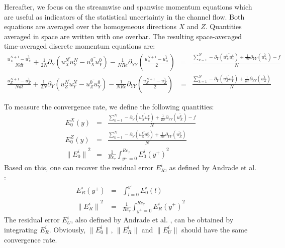 \documentclass[aip,pof,reprint]{revtex4-1}
\begin{document}
\begin{widetext}
Hereafter, we focus on the streamwise and spanwise momentum equations which are useful as indicators of the statistical uncertainty in the channel flow.
Both equations are averaged over the homogeneous directions $X$ and $Z$.
Quantities averaged in space are written with one overbar.
The resulting space-averaged time-averaged discrete momentum equations are:
\begin{eqnarray}
\label{qdm_sum_x}
\frac{\overline{u_X^{N+1}}-\overline{u_X^1}}{Ndt}
+ \frac{1}{2N} \partial_Y \left( \overline{u_X^{N} u_Y^{N}} - \overline{u_X^0 u_Y^0} \right)
- \frac{1}{NRe} \partial_{YY} \left( \frac{\overline{u_X^{N+1}} - \overline{u_X^1}}{2}\right)
& = & \frac{ \sum_{k=1}^N
- \partial_Y \left( \overline{u_X^k u_Y^k} \right)
+ \frac{1}{Re} \partial_{YY} \left( \overline{u_X^k} \right)
- f}{N} \\
\label{qdm_sum_z}
\frac{\overline{u_Z^{N+1}}-\overline{u_Z^1}}{Ndt}
+ \frac{1}{2N} \partial_Y \left( \overline{u_Z^{N} u_Y^{N}} - \overline{u_Z^0 u_Y^0} \right)
- \frac{1}{NRe} \partial_{YY} \left( \frac{\overline{u_Z^{N+1}} - \overline{u_Z^1}}{2}\right)
& = & \frac{\sum_{k=1}^N
- \partial_Y \left( \overline{u_Z^k u_Y^k} \right)
+ \frac{1}{Re} \partial_{YY} \left( \overline{u_Z^k}\right)}{N}
\end{eqnarray}
\end{widetext}

To measure the convergence rate, we define the following quantities:
\begin{eqnarray}
E_0^X\left(y\right) & = & \frac{\sum_{k=1}^N -\partial_Y \left( \overline{u_X^k u_Y^k} \right)+\frac{1}{Re}\partial_{YY}\left( \overline{u_X^k} \right)-f}{N} \nonumber \\
E_0^Z\left(y\right) & = & \frac{\sum_{k=1}^N -\partial_Y \left( \overline{u_Z^k u_Y^k} \right)+\frac{1}{Re}\partial_{YY}\left( \overline{u_Z^k} \right)}{N} \nonumber \\
{\parallel{E_0^i}\parallel}^2 & = & \frac{1}{{Re}_\tau} \int_{y^+=0}^{{Re}_\tau} {E_0^i\left(y^+\right)}^2
\end{eqnarray}
Based on this, one can recover the residual error $E^i_R$, as defined by Andrade et al. \cite{andrade}:
\begin{eqnarray}
\label{definition_ER}
E^i_R \left(y^+\right) & = & \int_{l=0}^{y^+} E_0^i\left(l\right)  \\
{\parallel{E^i_R}\parallel}^2 & = & \frac{1}{{Re}_\tau} \int_{y^+=0}^{{Re}_\tau} {E^i_R \left(y^+\right)}^2
\end{eqnarray}
The residual error $E^i_U$, also defined by Andrade et al. \cite{andrade}, can be obtained by integrating $E^i_R$.
Obviously, $\parallel{E_0^i}\parallel$, $\parallel{E^i_R}\parallel$ and $\parallel {E^i_U} \parallel $ should have the same convergence rate.
\end{document}
